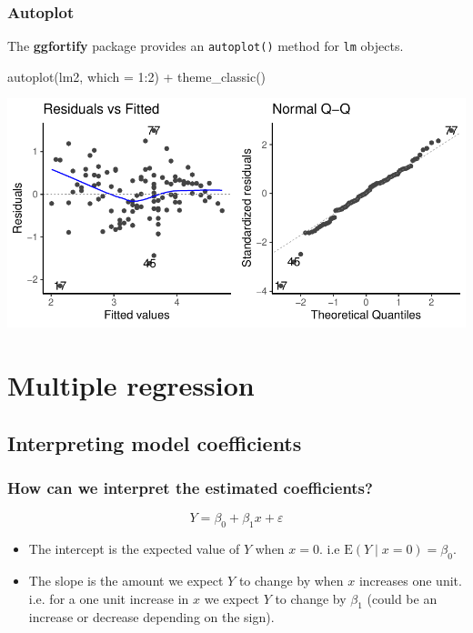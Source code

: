 \documentclass[a4paper]{article}\usepackage[]{graphicx}\usepackage[]{xcolor}
\makeatletter
\def\maxwidth{ %
  \ifdim\Gin@nat@width>\linewidth
    \linewidth
  \else
    \Gin@nat@width
  \fi
}
\makeatother
\begin{document}
\subsubsection{Autoplot}
The \textbf{ggfortify} package provides an \lstinline|autoplot()| method for \lstinline|lm| objects.
\begin{Schunk}
\begin{Sinput}
autoplot(lm2, which = 1:2) + theme_classic()
\end{Sinput}


{\centering \includegraphics[width=\maxwidth]{figure/listings-unnamed-chunk-353-1} 

}

\end{Schunk}

\section{Multiple regression}\label{sec:27}
\subsection{Interpreting model coefficients}
\subsubsection{How can we interpret the estimated coefficients?}
\[
	Y = \beta_0 + \beta_1 x + \varepsilon
\]
\begin{itemize}
	\item The intercept is the expected value of \( Y \) when \( x = 0 \). i.e \( \mathrm{E}(Y \mid x=0) = \beta_0 \).
	\item The slope is the amount we expect \( Y \) to change by when \( x \) increases one unit. i.e. for a one unit increase in \( x \) we expect \( Y \) to change by \( \beta_1 \) (could be an increase or decrease depending on the sign).
\end{itemize}
\end{document}

